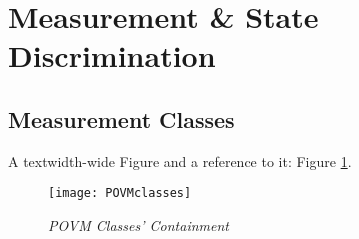 \section{Measurement \& State Discrimination}
\label{sec:MeasurAndStateDiscr}


\subsection{Measurement Classes}
\label{sec:SubPOVMclasses}

A textwidth-wide Figure and a reference to it: Figure \ref{fig:POVMclasses}.

\begin{figure}\centering
    \texttt{[image: POVMclasses]}
    \caption{\it POVM Classes' Containment}
    \label{fig:POVMclasses}
\end{figure}


